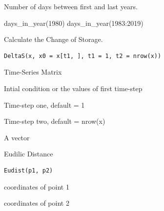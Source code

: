 \documentclass[a4paper]{book}
\begin{document}
%
\begin{Value}
Number of days between first and last years.
\end{Value}
%
\begin{Examples}
\begin{ExampleCode}
days_in_year(1980)
days_in_year(1983:2019)
\end{ExampleCode}
\end{Examples}
%
\begin{Description}\relax
Calculate the Change of Storage.
\end{Description}
%
\begin{Usage}
\begin{verbatim}
DeltaS(x, x0 = x[t1, ], t1 = 1, t2 = nrow(x))
\end{verbatim}
\end{Usage}
%
\begin{Arguments}
\begin{ldescription}
\item[\code{x}] Time-Series Matrix

\item[\code{x0}] Intial condition or the values of first time-step

\item[\code{t1}] Time-step one, default = 1

\item[\code{t2}] Time-step two, default = nrow(x)
\end{ldescription}
\end{Arguments}
%
\begin{Value}
A vector
\end{Value}
%
\begin{Description}\relax
Eudilic Distance
\end{Description}
%
\begin{Usage}
\begin{verbatim}
Eudist(p1, p2)
\end{verbatim}
\end{Usage}
%
\begin{Arguments}
\begin{ldescription}
\item[\code{p1}] coordinates of point 1

\item[\code{p2}] coordinates of point 2
\end{ldescription}
\end{Arguments}
\end{document}
